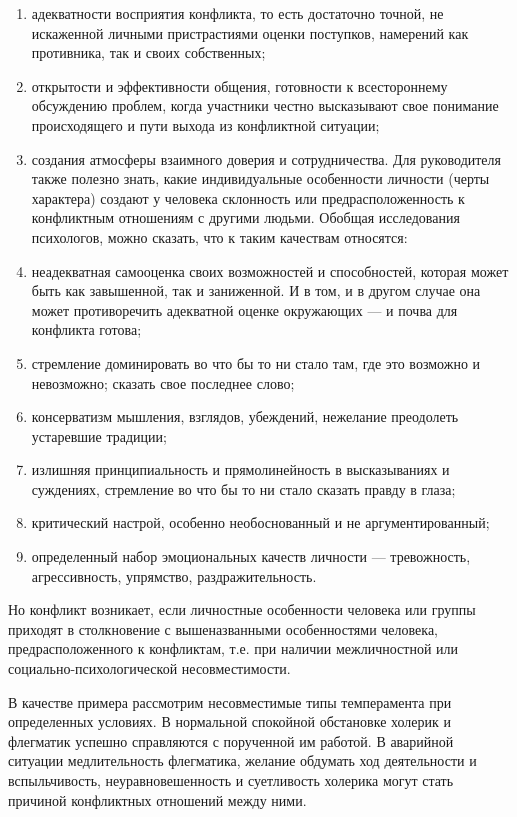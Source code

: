 \documentclass[a4paper,14pt]{extarticle}
\begin{document}
\begin{enumerate}
    \item адекватности восприятия конфликта, то есть достаточно точной, не искаженной личными пристрастиями оценки поступков, намерений как противника, так и своих собственных;
    \item открытости и эффективности общения, готовности к всестороннему обсуждению проблем, когда участники честно высказывают свое понимание происходящего и пути выхода из конфликтной ситуации;
    \item создания атмосферы взаимного доверия и сотрудничества. Для руководителя также полезно знать, какие индивидуальные особенности личности (черты характера) создают у человека склонность или предрасположенность к конфликтным отношениям с другими людьми. Обобщая исследования психологов, можно сказать, что к таким качествам относятся:
    \item неадекватная самооценка своих возможностей и способностей, которая может быть как завышенной, так и заниженной. И в том, и в другом случае она может противоречить адекватной оценке окружающих — и почва для конфликта готова;
    \item стремление доминировать во что бы то ни стало там, где это возможно и невозможно; сказать свое последнее слово;
    \item консерватизм мышления, взглядов, убеждений, нежелание преодолеть устаревшие традиции;
    \item излишняя принципиальность и прямолинейность в высказываниях и суждениях, стремление во что бы то ни стало сказать правду в глаза;
    \item критический настрой, особенно необоснованный и не аргументированный;
    \item определенный набор эмоциональных качеств личности — тревожность, агрессивность, упрямство, раздражительность.
\end{enumerate}

Но конфликт возникает, если личностные особенности человека или группы приходят в столкновение с вышеназванными особенностями человека, предрасположенного к конфликтам, т.е. при наличии межличностной или социально-психологической несовместимости.

В качестве примера рассмотрим несовместимые типы темперамента при определенных условиях. В нормальной спокойной    обстановке холерик и флегматик успешно справляются с порученной им работой. В аварийной ситуации медлительность флегматика, желание обдумать ход деятельности и вспыльчивость, неуравновешенность и суетливость холерика могут стать причиной конфликтных отношений между ними.
\end{document}
